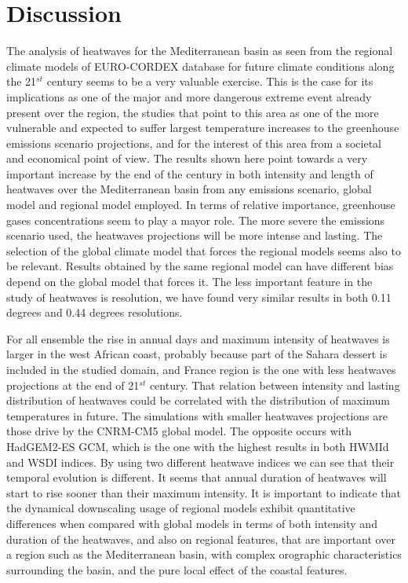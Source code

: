 \section{Discussion}

The analysis of heatwaves for the Mediterranean basin as seen from the regional
climate models of EURO-CORDEX database for future climate conditions along
the 21$^{st}$ century seems to be a very valuable exercise. This is the case for its
implications as one of the major and more dangerous extreme event already
present over the region, the studies that point to this area as one
of the more vulnerable and expected to suffer largest temperature increases to
the greenhouse emissions scenario projections, and for the interest
of this area from a societal and economical point of view. The results
shown here point towards a very important increase by the end of the century 
in both intensity and length of heatwaves over the Mediterranean basin from
any emissions scenario, global model and regional model employed.
In terms of relative importance, greenhouse gases concentrations seem to
play a mayor role. The more severe the emissions scenario used,  the heatwaves
projections will be more intense and lasting. The selection of the global climate
model that forces the regional models seems also to be relevant. 
Results obtained by the same regional model can have different bias depend on the
global model that forces it. 
The less important feature in the study of heatwaves is resolution, we have found very
similar results in both 0.11 degrees and 0.44 degrees resolutions. 

For all ensemble the rise in annual days and maximum intensity of heatwaves is larger
in the west African coast, probably because part of the Sahara dessert is included in
the studied domain, and France region is the one with less heatwaves projections at
the end of 21$^{st}$ century. That relation between intensity and lasting distribution
of heatwaves could be correlated with the distribution of maximum temperatures in
future. The simulations with smaller heatwaves projections are those drive by the
CNRM-CM5 global model. The opposite occurs with HadGEM2-ES GCM, which is the one with
the highest results in both HWMId and WSDI indices. By using two different heatwave
indices we can see that their temporal evolution is different. It seems that annual
duration of heatwaves will start to rise sooner than their maximum intensity.
It is important to indicate that the dynamical downscaling usage of regional models
exhibit quantitative differences when compared with global models in terms of both
intensity and duration of the heatwaves, and also on regional features, that are
important over a region such as the Mediterranean basin, with complex orographic
characteristics surrounding the basin, and the pure local effect of the coastal features.

